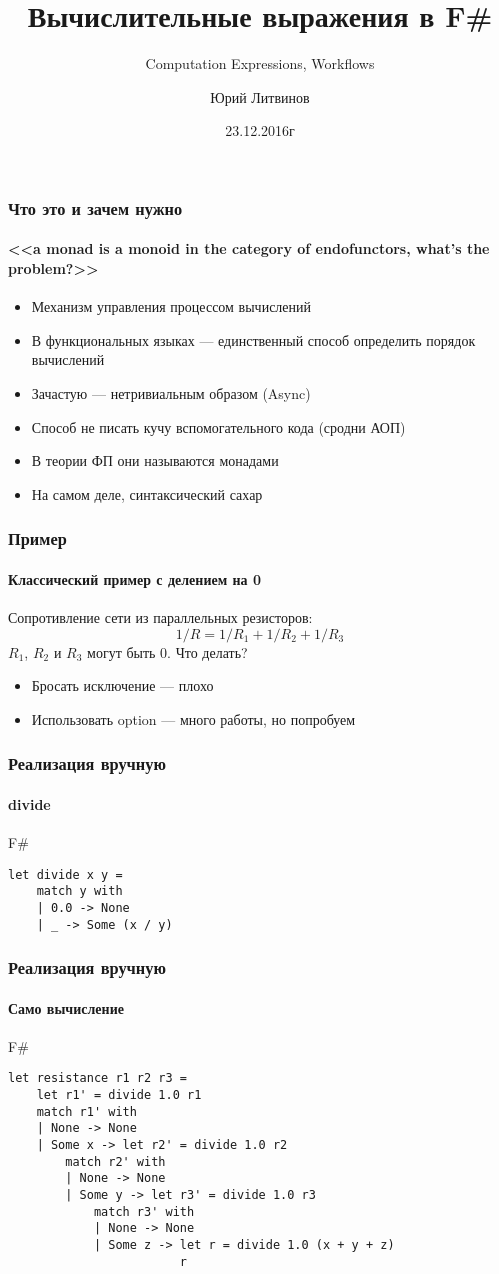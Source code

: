\documentclass[xetex,mathserif,serif]{beamer}
\title{Вычислительные выражения в F\#}
\subtitle{Computation Expressions, Workflows}
\author{Юрий Литвинов}
\date{23.12.2016г}
\begin{document}
	
	\frame{\titlepage}
	
	\begin{frame}
		\frametitle{Что это и зачем нужно}
        \framesubtitle{<<a monad is a monoid in the category of endofunctors, what's the problem?>>}
        \begin{itemize}
            \item Механизм управления процессом вычислений
            \item В функциональных языках --- единственный способ определить порядок вычислений
            \item Зачастую --- нетривиальным образом (Async)
            \item Способ не писать кучу вспомогательного кода (сродни АОП)
            \item В теории ФП они называются монадами
            \item На самом деле, синтаксический сахар
        \end{itemize}
	\end{frame}	

	\begin{frame}
		\frametitle{Пример}
        \framesubtitle{Классический пример с делением на 0}
        Сопротивление сети из параллельных резисторов:
        $$1/R = 1/R_1 + 1/R_2 + 1/R_3$$
        $R_1$, $R_2$ и $R_3$ могут быть 0. Что делать?
        \begin{itemize}
            \item Бросать исключение --- плохо
            \item Использовать option --- много работы, но попробуем
        \end{itemize}
	\end{frame}	

	\begin{frame}[fragile]
		\frametitle{Реализация вручную}
        \framesubtitle{divide}
      		\begin{exampleblock}{F\#}
      			\begin{lstlisting}
let divide x y =
    match y with
    | 0.0 -> None
    | _ -> Some (x / y)
\end{lstlisting}
\end{exampleblock}
\end{frame}	

	\begin{frame}[fragile]
		\frametitle{Реализация вручную}
        \framesubtitle{Само вычисление}
      		\begin{exampleblock}{F\#}
      			\begin{lstlisting}
let resistance r1 r2 r3 =
    let r1' = divide 1.0 r1
    match r1' with
    | None -> None
    | Some x -> let r2' = divide 1.0 r2
        match r2' with
        | None -> None
        | Some y -> let r3' = divide 1.0 r3
            match r3' with
            | None -> None
            | Some z -> let r = divide 1.0 (x + y + z)
                        r
\end{lstlisting}
\end{exampleblock}
\end{frame}	
\end{document}
